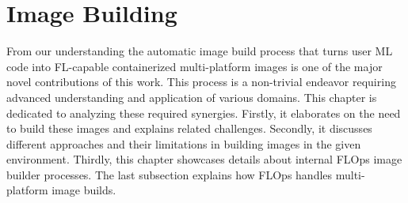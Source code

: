 \section{Image Building}

From our understanding the automatic image build process that turns user ML code into FL-capable containerized multi-platform images is one of the major novel contributions of this work.
This process is a non-trivial endeavor requiring advanced understanding and application of various domains.
This chapter is dedicated to analyzing these required synergies.
Firstly, it elaborates on the need to build these images and explains related challenges.
Secondly, it discusses different approaches and their limitations in building images in the given environment.
Thirdly, this chapter showcases details about internal FLOps image builder processes.
The last subsection explains how FLOps handles multi-platform image builds.










